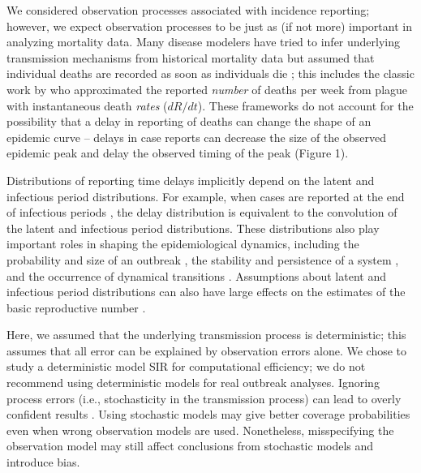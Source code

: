 \documentclass[12pt]{article}\usepackage[]{graphicx}\usepackage[]{color}
\begin{document}
We considered observation processes associated with incidence 
reporting; however, we expect observation processes to be just as 
(if not more) important in analyzing mortality data. Many disease modelers have
tried to infer underlying transmission mechanisms from historical mortality 
data but assumed that individual deaths are recorded as soon as individuals die 
\citep{he2013inferring, didelot2017model, dean2018human}; this includes the classic work by
\cite{kermack1927contribution} who approximated the reported \emph{number} of
deaths per week from plague with instantaneous death \emph{rates} ($dR/dt$).
These frameworks do not account for the possibility 
that a delay in reporting of deaths can
change the shape of an epidemic curve -- delays in case reports can decrease
the size of the observed epidemic peak and delay the observed timing of the peak (Figure 1). 

Distributions of reporting time delays implicitly depend on the latent and infectious 
period distributions. For example, when cases are reported
at the end of infectious periods \citep{breto2009time, he2009plug, lin2016seasonality},
the delay distribution is equivalent to the convolution of the latent and
infectious period distributions. These distributions also play important roles in 
shaping the epidemiological dynamics,
including the probability and size of an outbreak
\citep{anderson1980spread}, the stability and persistence of a system
\citep{keeling1998effect, lloyd2001destabilization, lloyd2001realistic},
and the  occurrence of dynamical transitions \citep{krylova2013effects}.
Assumptions about latent and infectious period distributions can also have large effects on the estimates of the basic reproductive number \citep{wearing2005appropriate}.

Here, we assumed that the underlying transmission process is deterministic; this 
assumes that all error can be explained by observation errors alone. 
We chose to study a deterministic model SIR for computational efficiency; 
we do not recommend using deterministic models for real outbreak analyses.
Ignoring process errors (i.e., stochasticity in the transmission process) can lead to
overly confident results \citep{king2015avoidable}. Using stochastic models may
give better coverage probabilities even when wrong observation models are used.
Nonetheless, misspecifying the observation model may still affect conclusions from 
stochastic models and introduce bias.
\end{document}
